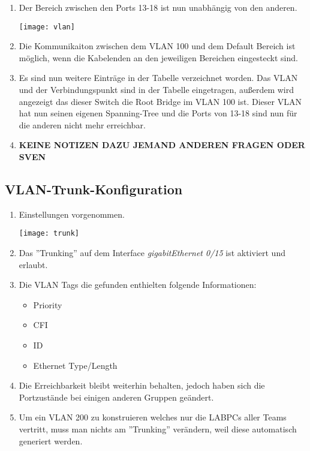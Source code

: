 \documentclass{scrartcl}
\begin{document}
  \renewcommand{\labelenumi}{\alph{enumi})}
  \begin{enumerate}
    \item
    Der Bereich zwischen den Ports 13-18 ist nun unabhängig von den anderen.
    
    \texttt{[image: vlan]}
    \label{fig:vlan}
    
    \item
    Die Kommunikaiton zwischen dem VLAN 100 und dem Default Bereich ist möglich, wenn die Kabelenden an den jeweiligen Bereichen eingesteckt sind.
    
    \item
    Es sind nun weitere Einträge in der Tabelle verzeichnet worden. Das VLAN und der Verbindungspunkt sind in der Tabelle eingetragen, außerdem wird angezeigt das dieser Switch die Root Bridge im VLAN 100 ist. Dieser VLAN hat nun seinen eigenen Spanning-Tree und die Ports von 13-18 sind nun für die anderen nicht mehr erreichbar.
    
    \item
    \textbf{KEINE NOTIZEN DAZU JEMAND ANDEREN FRAGEN ODER SVEN}
    
  \end{enumerate}
    
  \subsection[Aufgabe 8 VLAN-Trunk-Konfiguration]{VLAN-Trunk-Konfiguration}
    
  \renewcommand{\labelenumi}{\alph{enumi})}
  \begin{enumerate}
     \item
     Einstellungen vorgenommen.
     
     \texttt{[image: trunk]}
     \label{fig:trunk}
     
     \item
     Das ''Trunking'' auf dem Interface \textit{gigabitEthernet 0/15} ist aktiviert und erlaubt.
     
     \item
     Die VLAN Tags die gefunden enthielten folgende Informationen:
     \begin{itemize}
     \item Priority
     \item CFI
     \item ID
     \item Ethernet Type/Length
     \end{itemize}
    
    \item
    Die Erreichbarkeit bleibt weiterhin behalten, jedoch haben sich die Portzustände bei einigen anderen Gruppen geändert.
    
    \item
    Um ein VLAN 200 zu konstruieren welches nur die LABPCs aller Teams vertritt, muss man nichts am ''Trunking'' verändern, weil diese automatisch generiert werden.
   \end{enumerate}
  
\end{document}
